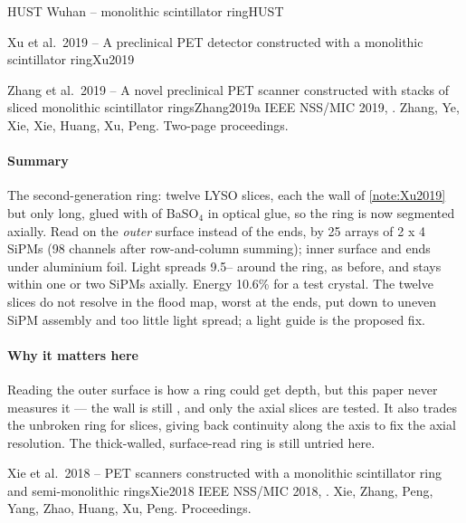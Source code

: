 \begin{programnote}{HUST Wuhan -- monolithic scintillator ring}{HUST}
\begin{papernote}{Xu et al.\ 2019 -- A preclinical PET detector constructed with a monolithic scintillator ring}{Xu2019}
\end{papernote}

\begin{papernote}{Zhang et al.\ 2019 -- A novel preclinical PET scanner constructed with stacks of sliced monolithic scintillator rings}{Zhang2019a}
IEEE NSS/MIC 2019, . Zhang, Ye, Xie,
Xie, Huang, Xu, Peng. Two-page proceedings.

\paragraph{Summary}
The second-generation ring: twelve LYSO slices, each the  wall of
\ref{note:Xu2019} but only  long, glued with  of BaSO$_4$ in
optical glue, so the ring is now segmented axially. Read on the \emph{outer}
surface instead of the ends, by 25 arrays of 2 x 4 SiPMs (98 channels after
row-and-column summing); inner surface and ends under aluminium foil. Light
spreads 9.5-- around the ring, as before, and stays within one or two
SiPMs axially. Energy 10.6\% for a test crystal. The twelve slices do not
resolve in the flood map, worst at the ends, put down to uneven SiPM assembly
and too little light spread; a light guide is the proposed fix.

\paragraph{Why it matters here}
Reading the outer surface is how a ring could get depth, but this paper never
measures it --- the wall is still , and only the axial slices are tested.
It also trades the unbroken ring for slices, giving back continuity along the
axis to fix the axial resolution. The thick-walled, surface-read ring is still
untried here.

\end{papernote}

\begin{papernote}{Xie et al.\ 2018 -- PET scanners constructed with a monolithic scintillator ring and semi-monolithic rings}{Xie2018}
IEEE NSS/MIC 2018, . Xie, Zhang, Peng, Yang,
Zhao, Huang, Xu, Peng. Proceedings.


\end{papernote}
\end{programnote}

